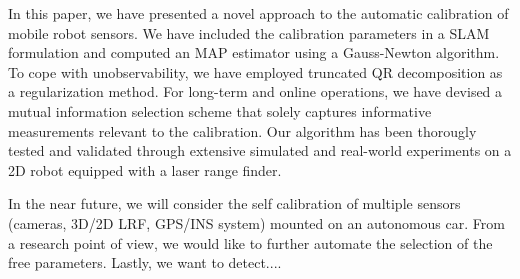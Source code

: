 In this paper, we have presented a novel approach to the automatic calibration
of mobile robot sensors. We have included the calibration parameters in a SLAM
formulation and computed an MAP estimator using a Gauss-Newton algorithm. To
cope with unobservability, we have employed truncated QR decomposition as a
regularization method. For long-term and online operations, we have devised
a mutual information selection scheme that solely captures informative
measurements relevant to the calibration. Our algorithm has been thorougly
tested and validated through extensive simulated and real-world experiments on
a 2D robot equipped with a laser range finder.

In the near future, we will consider the self calibration of multiple sensors
(cameras, 3D/2D LRF, GPS/INS system) mounted on an autonomous car. From a
research point of view, we would like to further automate the selection of the
free parameters. Lastly, we want to detect....
